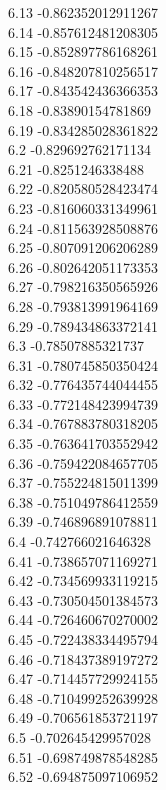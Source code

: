 {6.13	-0.862352012911267\\
6.14	-0.857612481208305\\
6.15	-0.852897786168261\\
6.16	-0.848207810256517\\
6.17	-0.843542436366353\\
6.18	-0.83890154781869\\
6.19	-0.834285028361822\\
6.2	-0.829692762171134\\
6.21	-0.8251246338488\\
6.22	-0.820580528423474\\
6.23	-0.816060331349961\\
6.24	-0.811563928508876\\
6.25	-0.807091206206289\\
6.26	-0.802642051173353\\
6.27	-0.798216350565926\\
6.28	-0.793813991964169\\
6.29	-0.789434863372141\\
6.3	-0.78507885321737\\
6.31	-0.780745850350424\\
6.32	-0.776435744044455\\
6.33	-0.772148423994739\\
6.34	-0.767883780318205\\
6.35	-0.763641703552942\\
6.36	-0.759422084657705\\
6.37	-0.755224815011399\\
6.38	-0.751049786412559\\
6.39	-0.746896891078811\\
6.4	-0.742766021646328\\
6.41	-0.738657071169271\\
6.42	-0.734569933119215\\
6.43	-0.730504501384573\\
6.44	-0.726460670270002\\
6.45	-0.722438334495794\\
6.46	-0.718437389197272\\
6.47	-0.714457729924155\\
6.48	-0.710499252639928\\
6.49	-0.706561853721197\\
6.5	-0.702645429957028\\
6.51	-0.698749878548285\\
6.52	-0.694875097106952\\
}
